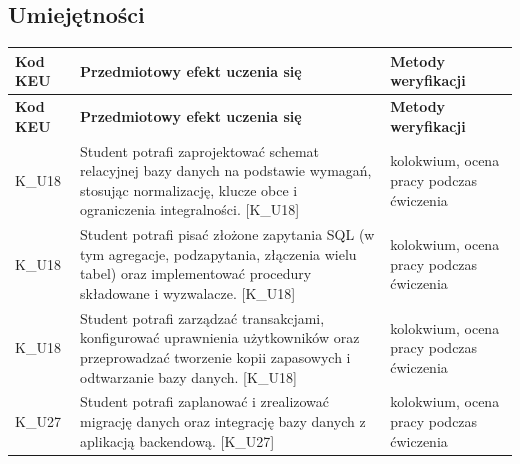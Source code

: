 \documentclass[12pt, a4paper]{article}
\newcommand{\thdrule}{\noalign{\global\setlength{\extrarowheight}{0pt}}}
\newcommand{\thdend}{\noalign{\global\setlength{\extrarowheight}{3pt}}}
\begin{document}
\subsection*{Umiejętności}
{\scriptsize
\begin{longtable}{m{1.6cm}m{9.0cm}m{4.2cm}}
\thdrule\toprule
\rowcolor{pjatkRed} {\color{white}\footnotesize\textbf{\vphantom{Ag}Kod KEU}} & {\color{white}\footnotesize\textbf{\vphantom{Ag}Przedmiotowy efekt uczenia się}} & {\color{white}\footnotesize\textbf{\vphantom{Ag}Metody weryfikacji}} \\
\midrule\thdend
\endfirsthead
\thdrule\toprule
\rowcolor{pjatkRed} {\color{white}\footnotesize\textbf{\vphantom{Ag}Kod KEU}} & {\color{white}\footnotesize\textbf{\vphantom{Ag}Przedmiotowy efekt uczenia się}} & {\color{white}\footnotesize\textbf{\vphantom{Ag}Metody weryfikacji}} \\
\midrule\thdend
\endhead
  \rowcolor{tableRowLight} K\_U18 & Student potrafi zaprojektować schemat relacyjnej bazy danych na podstawie wymagań, stosując normalizację, klucze obce i ograniczenia integralności. {[}K\_U18{]} & kolokwium, ocena pracy podczas ćwiczenia \\
  \rowcolor{tableRowAlt} K\_U18 & Student potrafi pisać złożone zapytania SQL (w tym agregacje, podzapytania, złączenia wielu tabel) oraz implementować procedury składowane i wyzwalacze. {[}K\_U18{]} & kolokwium, ocena pracy podczas ćwiczenia \\
  \rowcolor{tableRowLight} K\_U18 & Student potrafi zarządzać transakcjami, konfigurować uprawnienia użytkowników oraz przeprowadzać tworzenie kopii zapasowych i odtwarzanie bazy danych. {[}K\_U18{]} & kolokwium, ocena pracy podczas ćwiczenia \\
  \rowcolor{tableRowAlt} K\_U27 & Student potrafi zaplanować i zrealizować migrację danych oraz integrację bazy danych z aplikacją backendową. {[}K\_U27{]} & kolokwium, ocena pracy podczas ćwiczenia \\
\bottomrule
\end{longtable}}
\end{document}
